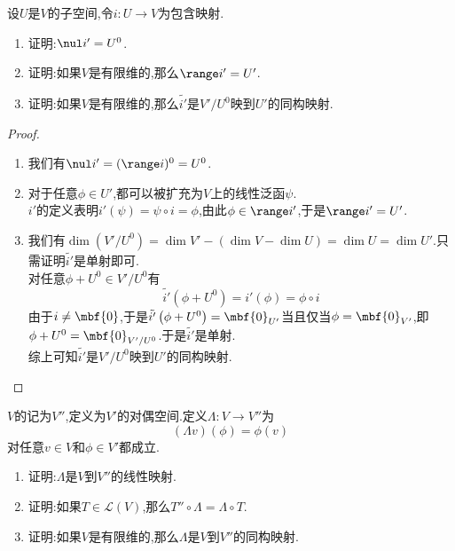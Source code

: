 \documentclass{ctexart}
\begin{document}
\begin{problem}[31.]
    设$U$是$V$的子空间,令$i:U\to V$为包含映射.
    \begin{enumerate}[label=\tbf{(\arabic*)}]
        \item 证明:$\nul i'=U^0$.
        \item 证明:如果$V$是有限维的,那么$\range i'=U'$.
        \item 证明:如果$V$是有限维的,那么$\tilde{i'}$是$V'/U^0$映到$U'$的同构映射.
    \end{enumerate}
\end{problem}
\begin{proof}
    \begin{enumerate}[label=\tbf{(\arabic*)}]
        \item 我们有$\nul i'=(\range i)^0=U^0$.
        \item 对于任意$\phi\in U'$,都可以被扩充为$V$上的线性泛函$\psi$.\\
            $i'$的定义表明$i'(\psi)=\psi\circ i=\phi$,由此$\phi\in\range i'$,于是$\range i'=U'$.
        \item 我们有$\dim\left(V'/U^0\right)=\dim V'-(\dim V-\dim U)=\dim U=\dim U'$.只需证明$\tilde{i'}$是单射即可.\\
            对任意$\phi+U^0\in V'/U^0$有$$\tilde{i'}\left(\phi+U^0\right)=i'(\phi)=\phi\circ i$$
            由于$i\neq\mbf{0}$,于是$\tilde{i'}\left(\phi+U^0\right)=\mbf{0}_{U'}$当且仅当$\phi=\mbf{0}_{V'}$,即$\phi+U^0=\mbf{0}_{V'/U^0}$.于是$\tilde{i'}$是单射.\\
            综上可知$\tilde{i'}$是$V'/U^0$映到$U'$的同构映射.
    \end{enumerate}
\end{proof}
\begin{problem}[32.]
    $V$的记为$V''$,定义为$V'$的对偶空间.定义$\Lambda:V\to V''$为
    $$(\Lambda v)(\phi)=\phi(v)$$对任意$v\in V$和$\phi\in V'$都成立.
    \begin{enumerate}[label=\tbf{(\arabic*)}]
        \item 证明:$\Lambda$是$V$到$V''$的线性映射.
        \item 证明:如果$T\in\mathcal{L}(V)$,那么$T''\circ\Lambda=\Lambda\circ T$.
        \item 证明:如果$V$是有限维的,那么$\Lambda$是$V$到$V''$的同构映射.
    \end{enumerate}
\end{problem}
\end{document}
